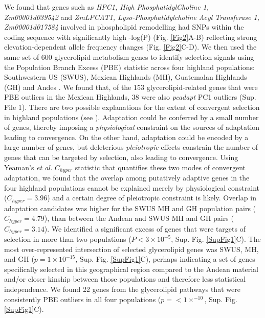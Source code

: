 \documentclass[9pt,twocolumn,twoside,lineno]{BioRxiv}
\begin{document}
We found that genes such as \textit{HPC1, High PhosphatidylCholine 1, Zm00001d039542} and \textit{ZmLPCAT1, Lyso-Phosphatidylcholine Acyl Transferase 1, Zm00001d017584} involved in phospholipid remodelling had SNPs within the coding sequence with significantly high -log(P) (Fig. \ref{Fig2}A-B) reflecting strong elevation-dependent allele frequency changes (Fig. \ref{Fig2}C-D). 
We then used the same set of 600 glycerolipid metabolism genes to identify selection signals using the Population Branch Excess (PBE) \cite{Pool2017-oa} statistic across four highland populations: Southwestern US (SWUS), Mexican Highlands (MH), Guatemalan Highlands (GH) and Andes \cite{Wang2020-mp}.
We found that, of the 153 glycerolipid-related genes that were PBE outliers in the Mexican Highlands, 38 were also \textit{pcadapt} PC1 outliers (Sup. File 1).
There are two possible explanations for the extent of convergent selection in highland populations (see \cite{Wang2020-mp, yeaman2018}). 
Adaptation could be conferred by a small number of genes, thereby imposing a \textit{physiological} constraint on the sources of adaptation leading to convergence. 
On the other hand, adaptation could be encoded by a large number of genes, but deleterious \textit{pleiotropic} effects constrain the number of genes that can be targeted by selection, also leading to convergence.  
Using Yeaman's \textit{et al.} $C_{hyper}$ statistic \cite{yeaman2018} that quantifies these two modes of convergent adaptation, we found that the overlap among putatively adaptive genes in the four highland populations cannot be explained merely by physiological constraint ($C_{hyper} = 3.96$) and a certain degree of pleiotropic constraint is likely.
Overlap in adaptation candidates was higher for the SWUS MH and GH population pairs ($C_{hyper} = 4.79$), than between the Andean and SWUS MH and GH pairs ($C_{hyper} = 3.14$).
We identified a significant excess of genes that were targets of selection in more than two populations ($P< 3 \times 10^{-5}$, Sup. Fig. \ref{SupFig1}C).
The most over-represented intersection of selected glycerolipid genes was SWUS, MH, and GH ($p = 1  \times 10 ^{-15} $, Sup. Fig. \ref{SupFig1}C), perhaps indicating a set of genes specifically selected in this geographical region compared to the Andean material and/or closer kinship between those populations and therefore less statistical independence.
We found 22 genes from the glycerolipid pathways that were consistently PBE outliers in all four populations ($p =<1  \times  ^{-10}$, Sup. Fig. \ref{SupFig1}C). 
\end{document}
